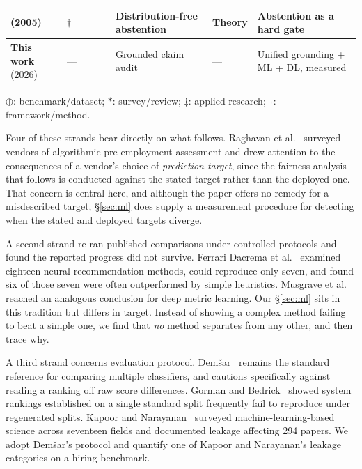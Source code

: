 \documentclass[manuscript,screen,review=false]{acmart}
\newcommand{\yes}{\textcolor{black}{\ding{51}}}
\newcommand{\no}{\textcolor{black}{\ding{55}}}
\begin{document}
\begin{table}[t]
\begin{tabular}{@{}llcccp{3.0cm}p{3.2cm}p{3.4cm}@{}}
\cite{vovk2005algorithmic} (2005) & $\dagger$ & \no & \yes & \no & Distribution-free abstention & Theory & Abstention as a hard gate \\
\midrule
\textbf{This work} (2026) & --- & \yes & \yes & \yes & Grounded claim audit & --- & Unified grounding + ML + DL, measured \\
\bottomrule
\end{tabular}
\vspace{2pt}
\footnotesize
$\oplus$: benchmark/dataset; $\ast$: survey/review; $\ddagger$: applied research;
$\dagger$: framework/method.
\end{table}

Four of these strands bear directly on what follows. Raghavan et al.~\cite{raghavan2020hiring}
surveyed vendors of algorithmic pre-employment assessment and drew attention to
the consequences of a vendor's choice of \emph{prediction target}, since the
fairness analysis that follows is conducted against the stated target rather than
the deployed one. That concern is central here, and although the paper offers no remedy for a misdescribed target, \S\ref{sec:ml} does supply a measurement procedure for detecting when the stated and deployed targets diverge.

A second strand re-ran published comparisons under controlled protocols and found
the reported progress did not survive. Ferrari Dacrema et
al.~\cite{dacrema2019progress} examined eighteen neural recommendation methods,
could reproduce only seven, and found six of those seven were often outperformed
by simple heuristics. Musgrave et al.~\cite{musgrave2020reality} reached an
analogous conclusion for deep metric learning. Our \S\ref{sec:ml} sits in this
tradition but differs in target. Instead of showing a complex method failing to beat a simple one, we find that \emph{no} method separates from any other, and
then trace why.

A third strand concerns evaluation protocol.
Demšar~\cite{demsar2006statistical} remains the standard reference for comparing multiple classifiers, and cautions specifically against reading a ranking off raw score differences. Gorman and Bedrick~\cite{gorman2019splits} showed system
rankings established on a single standard split frequently fail to reproduce
under regenerated splits. Kapoor and Narayanan~\cite{kapoor2023leakage} surveyed
machine-learning-based science across seventeen fields and documented leakage
affecting 294 papers. We adopt Demšar's protocol and quantify one of Kapoor and
Narayanan's leakage categories on a hiring benchmark.
\end{document}
